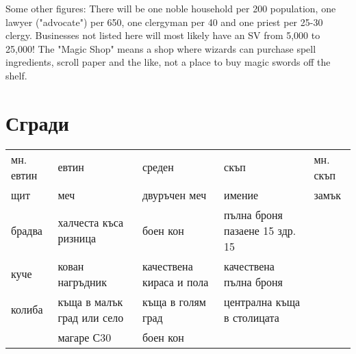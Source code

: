 Some other figures: There will be one noble household per 200 population, one lawyer ("advocate") per 650, one clergyman per 40 and one priest per 25-30 clergy. Businesses not listed here will most likely have an SV from 5,000 to 25,000! The "Magic Shop" means a shop where wizards can purchase spell ingredients, scroll paper and the like, not a place to buy magic swords off the shelf. 

\section{Сгради}
\begin{tabular}{p{3cm} | p{3cm} | p{3cm} | p{3cm} | p{3cm}}
мн. евтин & евтин                                   & среден                   & скъп                           & мн. скъп  \\
щит       & меч                                     & двуръчен меч             & имение                         & замък     \\
брадва    & халчеста къса ризница                   & боен кон                 & пълна броня пазаене 15 здр. 15 &           \\
куче      & кован нагръдник                         & качествена кираса и пола & качествена пълна броня         &           \\
колиба    & къща в малък град или село              & къща в голям град        & централна къща в столицата                 \\
          & магаре С30                              & боен кон                 &
\end{tabular}


